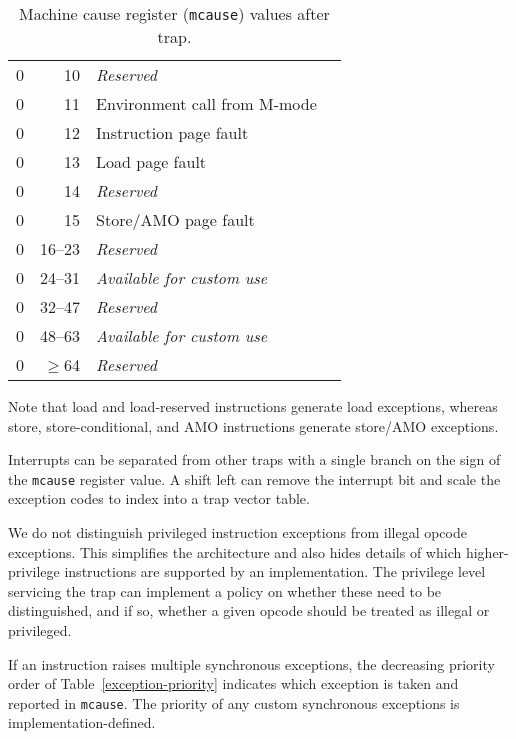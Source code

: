 \begin{table*}[htbp]
\begin{center}
\begin{tabular}{|r|r|l|l|}
  0         & 10              & {\em Reserved} \\
  0         & 11              & Environment call from M-mode \\
  0         & 12              & Instruction page fault \\
  0         & 13              & Load page fault \\
  0         & 14              & {\em Reserved} \\
  0         & 15              & Store/AMO page fault \\
  0         & 16--23          & {\em Reserved} \\
  0         & 24--31          & {\em Available for custom use} \\
  0         & 32--47          & {\em Reserved} \\
  0         & 48--63          & {\em Available for custom use} \\
  0         & $\ge$64         & {\em Reserved} \\
  \hline

\end{tabular}
\end{center}
\caption{Machine cause register ({\tt mcause}) values after trap.}
\label{mcauses}
\end{table*}

Note that load and load-reserved instructions generate load exceptions,
whereas store, store-conditional, and AMO instructions generate store/AMO
exceptions.

\begin{commentary}
Interrupts can be separated from other traps with a single branch on the sign of
the {\tt mcause} register value.  A shift left can remove the
interrupt bit and scale the exception codes to index into a trap
vector table.
\end{commentary}

\begin{commentary}
We do not distinguish privileged instruction exceptions from illegal
opcode exceptions.  This simplifies the architecture and also hides
details of which higher-privilege instructions are supported by an
implementation.  The privilege level servicing the trap can implement
a policy on whether these need to be distinguished, and if so, whether
a given opcode should be treated as illegal or privileged.
\end{commentary}

If an instruction raises multiple synchronous exceptions, the
decreasing priority order of Table~\ref{exception-priority}
indicates which exception is taken and reported in {\tt mcause}.
The priority of any custom synchronous exceptions is implementation-defined.

